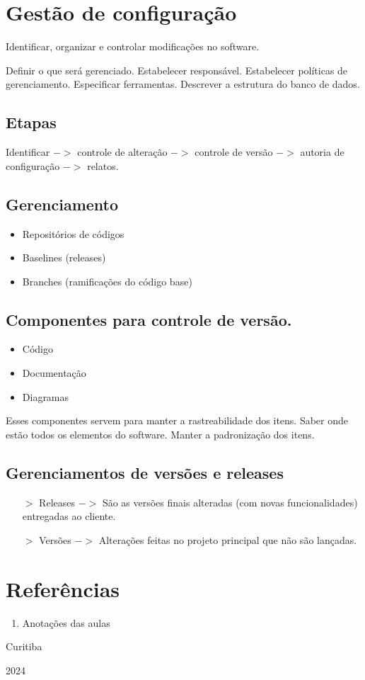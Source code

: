 \documentclass{article}
\begin{document}
\section{Gestão de configuração}
Identificar, organizar e controlar modificações no software.

Definir o que será gerenciado. Estabelecer responsável.
Estabelecer políticas de gerenciamento. Especificar ferramentas.
Descrever a estrutura do banco de dados.

\subsection*{Etapas}
Identificar $->$ controle de alteração $->$
controle de versão $->$ autoria de configuração $->$ relatos.

\subsection*{Gerenciamento}
\begin{itemize}
    \item Repositórios de códigos
    \item Baselines (releases)
    \item Branches (ramificações do código base)
\end{itemize}

\subsection*{Componentes para controle de versão.}

\begin{itemize}
    \item Código
    \item Documentação
    \item Diagramas
\end{itemize}

Esses componentes servem para manter a rastreabilidade dos itens.
Saber onde estão todos os elementos do software. Manter
a padronização dos itens.

\subsection*{Gerenciamentos de versões e releases}
\begin{itemize}
    \item[$>$] Releases $->$ São as versões finais alteradas (com novas funcionalidades)
    entregadas ao cliente.
    \item[$>$] Versões $->$ Alterações feitas no projeto principal que não
    são lançadas.
\end{itemize}

\section{Referências}
\begin{enumerate}
    \item Anotações das aulas
\end{enumerate}

\vfill
\begin{center}
    Curitiba

    2024
\end{center}
\end{document}
